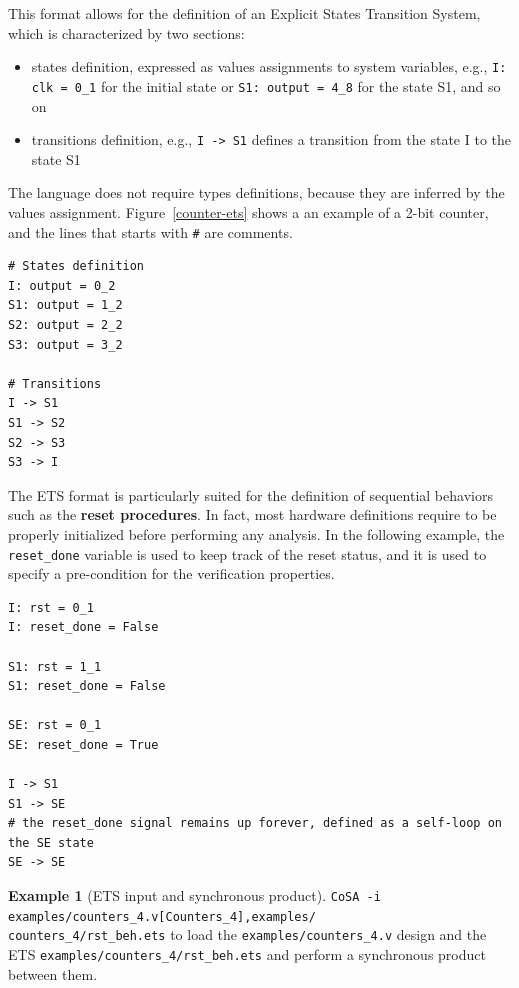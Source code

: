\documentclass{article}
\theoremstyle{definition}
\newtheorem{example}{Example}[section]
\begin{document}
This format allows for the definition of an Explicit States Transition System, which is characterized by two sections:
\begin{itemize}
\item states definition, expressed as values assignments to system
  variables, e.g., \texttt{I: clk = 0\_1} for the initial state or
  \texttt{S1: output = 4\_8} for the state S1, and so on
\item transitions definition, e.g., \texttt{I -> S1} defines a
  transition from the state I to the state S1
\end{itemize}

The language does not require types definitions, because they are
inferred by the values assignment. Figure~\ref{counter-ets} shows a an
example of a 2-bit counter, and the lines that starts with \texttt{\#}
are comments.

\begin{lstlisting}[frame=single,language=ets,caption=2-bit Counter,label=counter-ets]
# States definition
I: output = 0_2
S1: output = 1_2
S2: output = 2_2
S3: output = 3_2

# Transitions
I -> S1
S1 -> S2
S2 -> S3
S3 -> I
\end{lstlisting}

The ETS format is particularly suited for the definition of sequential
behaviors such as the \textbf{reset procedures}. In fact, most
hardware definitions require to be properly initialized before
performing any analysis. In the following example, the
\texttt{reset\_done} variable is used to keep track of the reset
status, and it is used to specify a pre-condition for the verification
properties.

\begin{lstlisting}[frame=single,language=ets,caption=Reset procedure example,label=reset]
I: rst = 0_1
I: reset_done = False

S1: rst = 1_1
S1: reset_done = False

SE: rst = 0_1
SE: reset_done = True

I -> S1
S1 -> SE
# the reset_done signal remains up forever, defined as a self-loop on the SE state
SE -> SE
\end{lstlisting}

\begin{example}[ETS input and synchronous product]
  \texttt{CoSA -i
    examples/counters\_4.v[Counters\_4],examples/\\counters\_4/rst\_beh.ets}
  to load the \texttt{examples/counters\_4.v} design and the ETS
  \texttt{examples/counters\_4/rst\_beh.ets} and perform a synchronous
  product between them.
\end{example}
\end{document}
